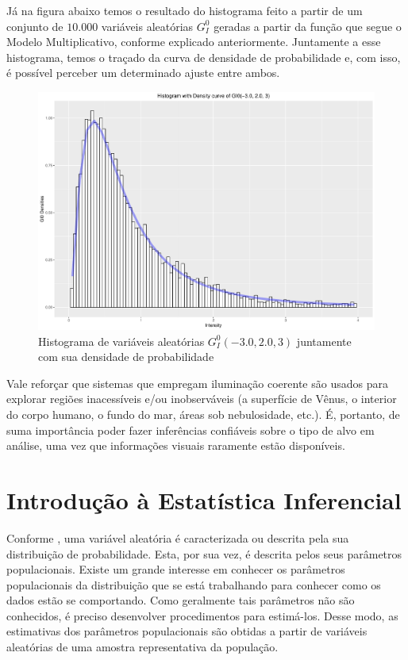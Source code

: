 Já na figura abaixo temos o resultado do histograma feito a partir de um conjunto de $10.000$ variáveis aleatórias $G_I^0$ geradas a partir da função que segue o Modelo Multiplicativo, conforme explicado anteriormente. Juntamente a esse histograma, temos o traçado da curva de densidade de probabilidade e, com isso, é possível perceber um determinado ajuste entre ambos.
\begin{figure}[H]
     \centering
     \includegraphics[scale=0.5]{plots/GI0RandVar.pdf}
     \caption{Histograma de variáveis aleatórias $G_I^0(-3.0, 2.0, 3)$ juntamente com sua densidade de probabilidade}
     \label{graf_2}
\end{figure}

Vale reforçar que sistemas que empregam iluminação coerente são usados para explorar regiões inacessíveis e/ou inobserváveis (a superfície de Vênus, o interior do corpo humano, o fundo do mar, áreas sob nebulosidade, etc.). É, portanto, de suma importância poder fazer inferências confiáveis sobre o tipo de alvo em análise, uma vez que informações visuais raramente estão disponíveis.

				

\section{Introdução à Estatística Inferencial}

Conforme \citet{CasellaBergerStatisticalInference}, uma variável aleatória é caracterizada ou descrita pela sua distribuição de probabilidade. Esta, por sua vez, é descrita pelos seus parâmetros populacionais. Existe um grande interesse em conhecer os parâmetros populacionais da distribuição que se está trabalhando para conhecer como os dados estão se comportando. Como geralmente tais parâmetros não são conhecidos, é preciso desenvolver procedimentos para estimá-los. Desse modo, as estimativas dos parâmetros populacionais são obtidas a partir de variáveis aleatórias de uma amostra representativa da população.
 
